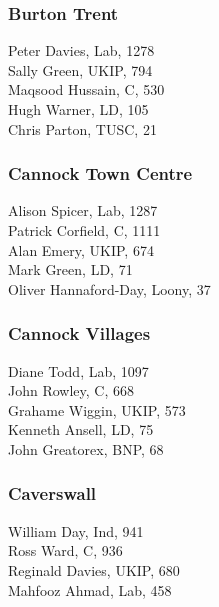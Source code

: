 \documentclass[a4paper,openany,10pt]{book}
\begin{document}
\subsubsection*{Burton Trent}



Peter Davies, Lab, 1278\\
Sally Green, UKIP, 794\\
Maqsood Hussain, C, 530\\
Hugh Warner, LD, 105\\
Chris Parton, TUSC, 21\\


\subsubsection*{Cannock Town Centre}



Alison Spicer, Lab, 1287\\
Patrick Corfield, C, 1111\\
Alan Emery, UKIP, 674\\
Mark Green, LD, 71\\
{Oliver Hannaford-Day}, Loony, 37\\


\subsubsection*{Cannock Villages}



Diane Todd, Lab, 1097\\
John Rowley, C, 668\\
Grahame Wiggin, UKIP, 573\\
Kenneth Ansell, LD, 75\\
John Greatorex, BNP, 68\\


\subsubsection*{Caverswall}



William Day, Ind, 941\\
Ross Ward, C, 936\\
Reginald Davies, UKIP, 680\\
Mahfooz Ahmad, Lab, 458\\
\end{document}
